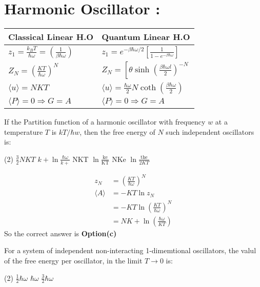 \section{Harmonic Oscillator :}
\renewcommand*{\arraystretch}{2}
\begin{tabular}{|p{6cm}|p{6cm}|}
	\hline
	Classical Linear H.O&Quantum Linear H.O\\
	\hline
	$z_{1}=\frac{k_{B} T}{\hbar \omega}=\left(\frac{1}{\beta \hbar \omega}\right)$&$z_{1}=e^{-\beta \hbar \omega / 2}\left[\frac{1}{1-e^{-\beta \hbar \omega}}\right]$\\\hline
	$Z_{N}=\left(\frac{K T}{\hbar \omega}\right)^{N}$&$Z_{N}=\left[\theta \sinh \left(\frac{\beta \hbar \omega l}{2}\right)^{-N}\right.$\\\hline
	$\langle u\rangle=N K T$&$\langle u\rangle=\frac{\hbar \omega}{2} N \operatorname{coth}\left(\frac{\beta \hbar \omega}{2}\right)$\\\hline
	$\langle P\rangle=0 \Rightarrow G=A$&$\langle P\rangle=0 \Rightarrow G=A$\\\hline
\end{tabular}
\begin{exercise}
	 If the Partition function of a harmonic oscillator with frequency $w$ at a temperature $T$ is $k T/ \hbar w$, then the free energy of $N$ such independent oscillators is:
	  \begin{tasks}(2)
	 	\task[\textbf{a.}]$\frac{3}{2} N K T$
	 	\task[\textbf{b.}]$k+\ln \frac{\hbar \omega}{k+}$
	 	\task[\textbf{c.}]NKT $\ln \frac{\mathrm{ke}}{\mathrm{KT}}$
	 	\task[\textbf{d.}] NKe $\ln \frac{\text { the }}{2 K T}$
	 \end{tasks}
\end{exercise}
\begin{answer}
	\begin{align*}
	z_{N} &=\left(\frac{K T}{\hbar \omega}\right)^{N} \\
	\langle A\rangle &=-K T \ln z_{N} \\
	&=-K T \ln \left(\frac{K T}{\hbar \omega}\right)^{N} \\
	&=N K+\ln \left(\frac{\hbar \omega}{K T}\right)
	\end{align*}
	So the correct answer is \textbf{Option(c)}
\end{answer}
\begin{exercise}
	For a system of independent non-interacting 1-dimemtional oscillators, the valul of the free energy per oscillator, in the limit $T \rightarrow 0$ is:
	 \begin{tasks}(2)
		\task[\textbf{a.}] $\frac{1}{2} \hbar \omega$
		\task[\textbf{b.}]$\hbar\omega$
		\task[\textbf{c.}]$\frac{3}{2} \hbar \omega$
	\end{tasks}
\end{exercise}
